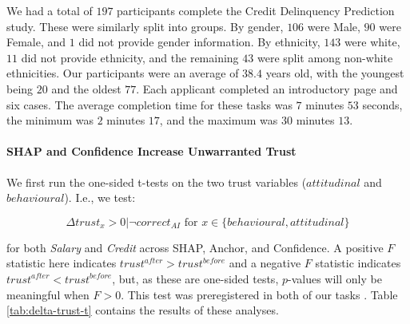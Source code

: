 We had a total of $197$ participants complete the Credit Delinquency Prediction study. These were similarly split into groups. By gender, $106$ were Male, $90$ were Female, and $1$ did not provide gender information. By ethnicity, $143$ were white, $11$ did not provide ethnicity, and the remaining $43$ were split among non-white ethnicities. Our participants were an average of $38.4$ years old, with the youngest being $20$ and the oldest $77$. Each applicant completed an introductory page and six cases. The average completion time for these tasks was $7$ minutes $53$ seconds, the minimum was $2$ minutes $17$, and the maximum was $30$ minutes $13$.

\paragraph{SHAP and Confidence Increase Unwarranted Trust}
We first run the one-sided t-tests on the two trust variables ($attitudinal$ and $behavioural$). I.e., we test:

\begin{equation}
    \Delta trust_{x} > 0 | \neg correct_{AI} \text{ for } x \in \{behavioural, attitudinal\}
\end{equation}

\noindent for both \emph{Salary} and \emph{Credit} across SHAP, Anchor, and Confidence. A positive $F$ statistic here indicates $trust^{after} > trust^{before}$ and a negative $F$ statistic indicates $trust^{after} < trust^{before}$, but, as these are one-sided tests, $p$-values will only be meaningful when $F > 0$. This test was preregistered in both of our tasks \cite{natarajan_binns_2022}. Table \ref{tab:delta-trust-t} contains the results of these analyses.  

